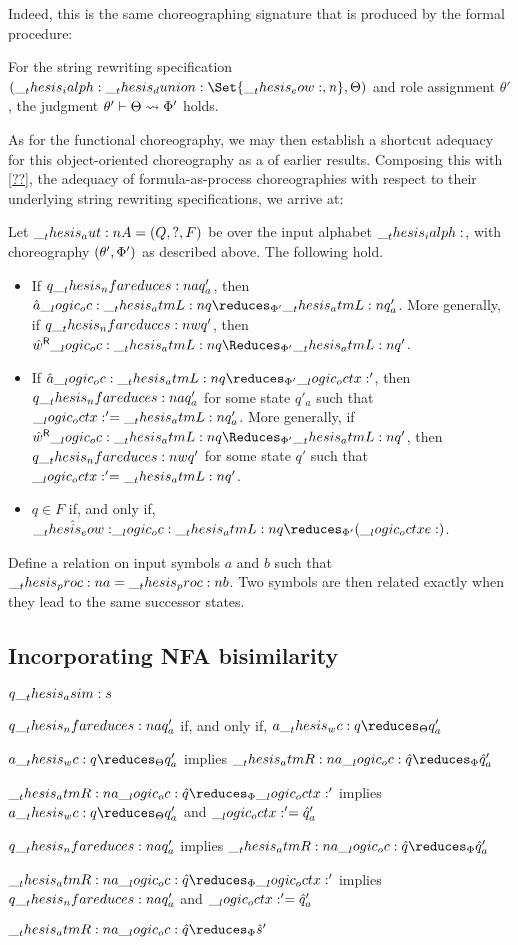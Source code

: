 Indeed, this is the same choreographing signature that is produced by the formal procedure:
\begin{proposition}
  For the string rewriting specification $(\ialph \dunion \Set{\eow, \symrej}, \srsig)$ and role assignment $\theta'$, the judgment $\theta' \vdash \Theta \rightsquigarrow \Phi'$ holds.
\end{proposition}
As for the functional choreography, we may then establish a shortcut adequacy for this object-oriented choreography as a  of earlier results.
Composing this  with \cref{??}, the adequacy of formula-as-process choreographies with respect to their underlying string rewriting specifications, we arrive at:
\begin{corollary}\label{cor:formula-as-process:nfa-oochor-adequacy}\leavevmode
  Let $\__thesis_aut:n {A} = (Q, ?, F)$ be  over the input alphabet $\__thesis_ialph:$, with choreography $(\theta', \Phi')$ as described above.
  The following hold.
  \begin{itemize}[nosep]
  \item
    If $q \nfareduces[a] q'_a$, then $\defp{a} \oc \atmL{q} \reduces_{\orsig'} \atmL{q}'_a$.
    More generally, if $q \nfareduces[w] q'$, then $\rev{\defp{w}} \oc \atmL{q} \Reduces_{\orsig'} \atmL{q}'$.
  \item
    If $\defp{a} \oc \atmL{q} \reduces_{\orsig'} \octx'$, then $q \nfareduces[a] q'_a$ for some state $q'_a$ such that $\__logic_octx:' = \__thesis_atmL:n {q}'_a$.
    More generally, if $\rev{\defp{w}} \oc \atmL{q} \Reduces_{\orsig'} \atmL{q}'$, then $q \nfareduces[w] q'$ for some state $q'$ such that $\__logic_octx:' = \__thesis_atmL:n {q}'$.
  \item
    $q \in F$ if, and only if, $\defp{\eow} \oc \atmL{q} \reduces_{\orsig'} (\octxe)$.
  \end{itemize}
\end{corollary}

Define a relation on input symbols $a$ and $b$ such that $\__thesis_proc:n {a} = \__thesis_proc:n {b}$.
Two symbols are then related exactly when they lead to the same successor states.

\subsection{Incorporating \acs*{NFA} bisimilarity}

$q \__thesis_asim: s$

$q \nfareduces[a] q'_a$ if, and only if, $a \wc q \reduces_{\srsig} q'_a$

$a \wc q \reduces_{\srsig} q'_a$ implies $\atmR{a} \oc \defp{q} \reduces_{\orsig} \defp{q}'_a$

$\atmR{a} \oc \defp{q} \reduces_{\orsig} \octx'$ implies $a \wc q \reduces_{\srsig} q'_a$ and $\__logic_octx:' = \hat{q}'_a$

$q \nfareduces[a] q'_a$ implies $\atmR{a} \oc \defp{q} \reduces_{\orsig} \defp{q}'_a$

$\atmR{a} \oc \defp{q} \reduces_{\orsig} \octx'$ implies $q \nfareduces[a] q'_a$ and $\__logic_octx:' = \hat{q}'_a$

$\atmR{a} \oc \defp{q} \reduces_{\orsig} \defp{s}'$




